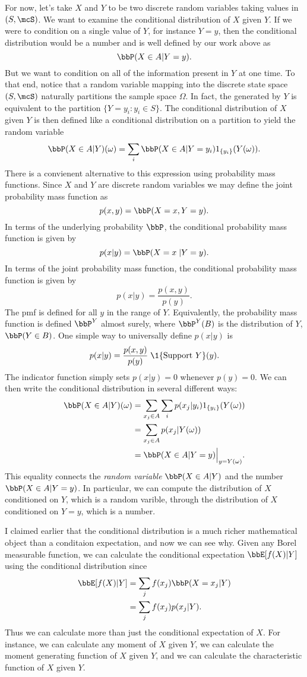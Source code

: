 \documentclass{report}
\begin{document}
For now, let's take $X$ and $Y$ to be two discrete random variables taking values in $(S,\mcS)$.  We want to examine the conditional distribution of $X$ given $Y$.  If we were to condition on a single value of $Y$, for instance $Y = y$, then the conditional distribution would be a number and is well defined by our work above as
\[
\bbP(X \in A | Y = y).
\]
But we want to condition on all of the information present in $Y$ at one time.  To that end, notice that a random variable mapping into the discrete state space $(S,\mcS)$ naturally partitions the sample space $\Omega$.  In fact, the \sigalg generated by $Y$  is equivalent to the partition $\{ Y = y_i : y_i \in S\}$.  The conditional distribution of $X$ given $Y$ is then defined like a conditional distribution on a partition to yield the random variable
\[
\bbP(X \in A | Y)(\omega) = \sum_i \bbP(X \in A | Y = y_i) 1_{\{y_i\}}(Y(\omega)).
\]
There is a convienent alternative to this expression using probability mass functions.  Since $X$ and $Y$ are discrete random variables we may define the joint probability mass function as
\[
p(x,y) = \bbP(X = x, Y = y).
\]
In terms of the underlying probability $\bbP$, the conditional probability mass function is given by
\[
p(x|y) = \bbP(X = x \; | Y = y).
\]
In terms of the joint probability mass function, the conditional probability mass function is given by
\[
p(x|y) = \frac{p(x,y)}{p(y)}.
\]
The pmf is defined for all $y$ in the range of $Y$.  Equivalently, the probability mass function is defined $\bbP^Y$ almost surely, where $\bbP^Y(B)$ is the distribution of $Y$, $\bbP(Y \in B)$.  One simple way to universally define $p(x|y)$ is 
\[
p(x|y) = \frac{p(x,y)}{p(y)} \; \1 {\{\textmd{Support } Y \}}(y).
\]
The indicator function simply sets $p(x|y) = 0$ whenever $p(y)=0$.
We can then write the conditional distribution in several different ways:
\begin{align*}
\bbP(X \in A | Y)(\omega) & = \sum_{x_j \in A} \sum_i p(x_j | y_i) 1_{\{y_i\}}(Y(\omega)) \\
& = \sum_{x_j \in A} p(x_j | Y(\omega)) \\
& = \bbP(X \in A | Y = y) \Big|_{y = Y(\omega)}.
\end{align*}
This equality connects the \emph{random variable} $\bbP(X \in A | Y)$ and the number $\bbP(X \in A | Y = y)$.  In particular, we can compute the distribution of $X$ conditioned on $Y$, which is a random varible, through the distribution of $X$ conditioned on $Y = y$, which is a number.

I claimed earlier that the conditional distribution is a much richer mathematical object than a conditaion expectation, and now we can see why.  Given any Borel measurable function, we can calculate the conditional expectation $\bbE[f(X)|Y]$ using the conditional distribution since
\begin{align*}
\bbE[f(X)|Y] & = \sum_{j} f(x_j) \bbP(X = x_j | Y) \\
& = \sum_{j} f(x_j) p(x_j | Y).
\end{align*}
Thus we can calculate more than just the conditional expectation of $X$.  For instance, we can calculate any moment of $X$ given $Y$, we can calculate the moment generating function of $X$ given $Y$, and we can calculate the characteristic function of $X$ given $Y$.
\end{document}

